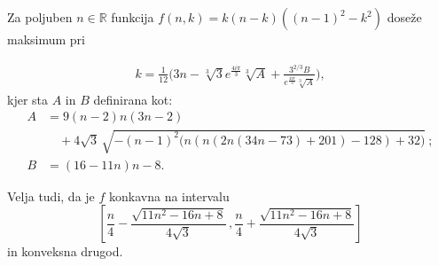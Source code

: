 \documentclass[fin1, tisk]{fmfdelo}
\newcommand{\R}{\mathbb R}
\begin{document}
\begin{trditev}\label{tr:glavna_k}
Za poljuben $n \in \R$ funkcija $f(n, k) = k (n-k) ((n-1)^2 - k^2)$ 
doseže maksimum pri 

\begin{align*}
k = \frac{1}{12} \Big(3 n  -
\sqrt[3]{3} e^{\frac{4 i \pi}{3}} \sqrt[3]{A} +
\frac{3^{2/3} B}{e^{\frac{4 i \pi}{3}} \sqrt[3]{A}}
 \Big),
\end{align*}
kjer sta $A$ in $B$ definirana kot:
\begin{align*}
A &= 9 (n-2) n (3 n-2) \\
  &\quad + 4 \sqrt{3}\, 
      \sqrt{-(n-1)^2 \bigl(n (n (2 n (34 n-73)+201)-128)+32\bigr)}\ ;\\
B &= (16-11 n)n - 8.
\end{align*}

\noindent Velja tudi, da je $f$ konkavna na 
intervalu 
\[\left[\frac{n}{4} - \frac{\sqrt{11n^2 - 16n +8}}{4\sqrt{3}}\,,
\frac{n}{4} + \frac{\sqrt{11n^2 - 16n +8}}{4\sqrt{3}}\right]
\]
in konveksna drugod.
\end{trditev}
\end{document}
